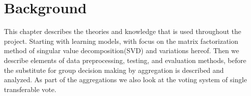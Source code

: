 \chapter{Background}

This chapter describes the theories and knowledge that is used throughout the project. Starting with learning models, with focus on the matrix factorization method of singular value decomposition(SVD) and variations hereof. Then we describe elements of data preprocessing, testing, and evaluation methods, before the substitute for group decision making by aggregation is described and analyzed. As part of the aggregations we also look at the voting system of single transferable vote.




